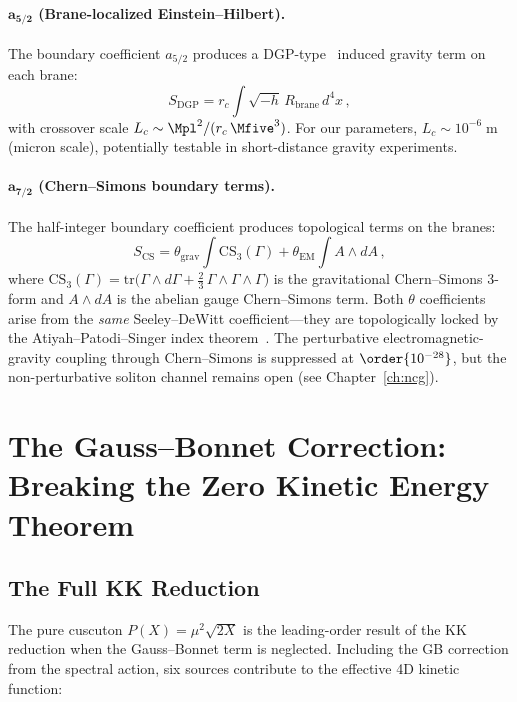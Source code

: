 \paragraph{$\bm{a_{5/2}}$ (Brane-localized Einstein--Hilbert).} The boundary coefficient $a_{5/2}$ produces a DGP-type~\cite{ch1:dgp} induced gravity term on each brane:
\begin{equation}
\label{eq:1-dgp}
S_{\mathrm{DGP}} = r_c \int \sqrt{-h}\, R_{\mathrm{brane}}\, d^4x\,,
\end{equation}
with crossover scale $L_c \sim \Mpl^2/(r_c\, \Mfive^3)$. For our parameters, $L_c \sim 10^{-6}\;\mathrm{m}$ (micron scale), potentially testable in short-distance gravity experiments.

\paragraph{$\bm{a_{7/2}}$ (Chern--Simons boundary terms).} The half-integer boundary coefficient produces topological terms on the branes:
\begin{equation}
\label{eq:1-cs-terms}
S_{\mathrm{CS}} = \theta_{\mathrm{grav}} \int \mathrm{CS}_3(\Gamma) + \theta_{\mathrm{EM}} \int A \wedge dA\,,
\end{equation}
where $\mathrm{CS}_3(\Gamma) = \mathrm{tr}\bigl(\Gamma \wedge d\Gamma + \tfrac{2}{3}\, \Gamma \wedge \Gamma \wedge \Gamma\bigr)$ is the gravitational Chern--Simons 3-form and $A \wedge dA$ is the abelian gauge Chern--Simons term. Both $\theta$ coefficients arise from the \emph{same} Seeley--DeWitt coefficient---they are topologically locked by the Atiyah--Patodi--Singer index theorem~\cite{ch1:aps75}. The perturbative electromagnetic-gravity coupling through Chern--Simons is suppressed at $\order{10^{-28}}$, but the non-perturbative soliton channel remains open (see Chapter~\ref{ch:ncg}).


\section{The Gauss--Bonnet Correction: Breaking the Zero Kinetic Energy Theorem}
\label{sec:1-gbbreak}

\subsection{The Full KK Reduction}
\label{sec:1-full-kk}

The pure cuscuton $P(X) = \mu^2\sqrt{2X}$ is the leading-order result of the KK reduction when the Gauss--Bonnet term is neglected. Including the GB correction from the spectral action, six sources contribute to the effective 4D kinetic function:

